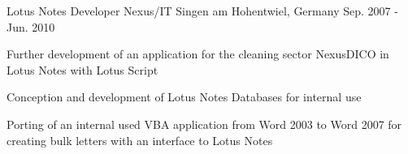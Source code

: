 \begin{cventries}
  \cventry
    {Lotus Notes Developer} %
    {Nexus/IT} %
    {Singen am Hohentwiel, Germany} %
    {Sep. 2007 - Jun. 2010} %
    {
      \begin{cvitems} %
        \item {Further development of an application for the cleaning sector Nexus\/DICO in Lotus Notes with Lotus Script}
        \item {Conception and development of Lotus Notes Databases for internal use}
        \item {Porting of an internal used VBA application from Word 2003 to Word 2007 for creating bulk letters with an interface to Lotus Notes}
      \end{cvitems}
    }

\end{cventries}
